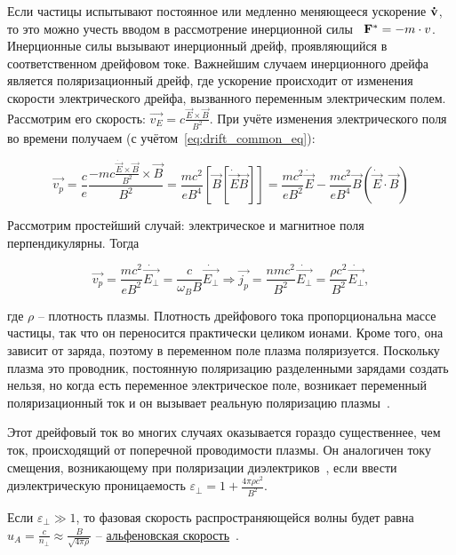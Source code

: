 \documentclass[10pt, a4paper]{article}
\begin{document}
Если частицы испытывают постоянное или медленно
меняющееся ускорение $\vb{\dot{v}}$, то это можно учесть вводом в рассмотрение инерционной силы~\cite{frank} $\vb{F^{*}}=-m\cdot v$. Инерционные силы вызывают инерционный дрейф, проявляющийся в соответственном дрейфовом токе. Важнейшим случаем инерционного дрейфа является поляризационный дрейф, где ускорение происходит от изменения
скорости электрического дрейфа, вызванного переменным
электрическим полем. Рассмотрим его скорость: $\overrightarrow{v_E} = c\frac{\vec{E}\times\vec{B}}{B^2}$. При учёте изменения электрического поля во времени получаем (с учётом~\eqref{eq:drift_common_eq}):

\begin{equation*}
	\overrightarrow{v_p} = \frac{c}{e}\frac{{-mc\frac{\dot{\vec{E}}\times\vec{B}}{B^2}}\times\vec{B}}{B^2}=\frac{mc^2}{eB^4}\left[\vec{B}\left[\dot{\vec{E}}\vec{B} \right]\right] = \frac{mc^2}{eB^2}\dot{\vec{E}}-\frac{mc^2}{eB^4}\vec{B}\left(\dot{\vec{E}}\cdot\vec{B}\right) 
\end{equation*}

Рассмотрим простейший случай: электрическое и магнитное поля перпендикулярны. Тогда

\begin{equation*}
	\overrightarrow{v_p} = \frac{mc^2}{eB^2}\dot{\overrightarrow{E_\perp}} = \frac{c}{\omega_BB}\dot{\overrightarrow{E_\perp}} \Rightarrow\overrightarrow{j_p}=\frac{nmc^2}{B^2}\dot{\overrightarrow{E_\perp}}=\frac{\rho c^2}{B^2}\dot{\overrightarrow{E_\perp}},
\end{equation*}

где $\rho$ -- плотность плазмы. Плотность дрейфового тока пропорциональна массе
частицы, так что он переносится практически целиком ионами. Кроме того, она зависит от заряда, поэтому в переменном поле плазма поляризуется. Поскольку плазма это проводник, постоянную поляризацию разделенными зарядами создать нельзя, но когда есть переменное электрическое поле, возникает переменный 
поляризационный ток и он вызывает реальную поляризацию плазмы~\cite{kotelnikov}.

Этот дрейфовый ток во многих случаях оказывается гораздо существеннее, чем ток, происходящий от поперечной проводимости плазмы. Он аналогичен току смещения, возникающему при поляризации диэлектриков~\cite{frank}, если ввести диэлектрическую проницаемость $\varepsilon_\perp=1+\frac{4\pi\rho c^2}{B^2}$.

Если $\varepsilon_\perp \gg 1$, то фазовая скорость распространяющейся волны будет равна $u_A = \frac{c}{n_\perp} \approx \frac{B}{\sqrt{4\pi\rho}}$ -- \uline{альфеновская скорость}~\cite{frank}.
\end{document}
